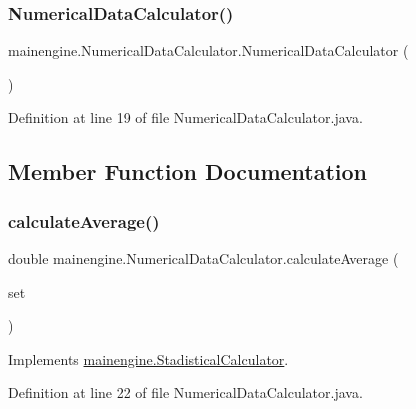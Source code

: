 \subsubsection{\texorpdfstring{Numerical\+Data\+Calculator()}{NumericalDataCalculator()}}
{\footnotesize\ttfamily mainengine.\+Numerical\+Data\+Calculator.\+Numerical\+Data\+Calculator (\begin{DoxyParamCaption}{ }\end{DoxyParamCaption})}



Definition at line 19 of file Numerical\+Data\+Calculator.\+java.



\subsection{Member Function Documentation}
\hypertarget{classmainengine_1_1_numerical_data_calculator_ac1f0d9cc0a35c84dc092b4c8b4fcd3ed}{}\label{classmainengine_1_1_numerical_data_calculator_ac1f0d9cc0a35c84dc092b4c8b4fcd3ed} 
\subsubsection{\texorpdfstring{calculate\+Average()}{calculateAverage()}}
{\footnotesize\ttfamily double mainengine.\+Numerical\+Data\+Calculator.\+calculate\+Average (\begin{DoxyParamCaption}\item[{Linked\+List$<$ Double $>$}]{set }\end{DoxyParamCaption})}



Implements \hyperlink{interfacemainengine_1_1_stadistical_calculator_abf970c09783d3f60e597256a97b936db}{mainengine.\+Stadistical\+Calculator}.



Definition at line 22 of file Numerical\+Data\+Calculator.\+java.

\hypertarget{classmainengine_1_1_numerical_data_calculator_ab0ceb7615ed1d5df5b1cae8d47895e7a}{}\label{classmainengine_1_1_numerical_data_calculator_ab0ceb7615ed1d5df5b1cae8d47895e7a} 
